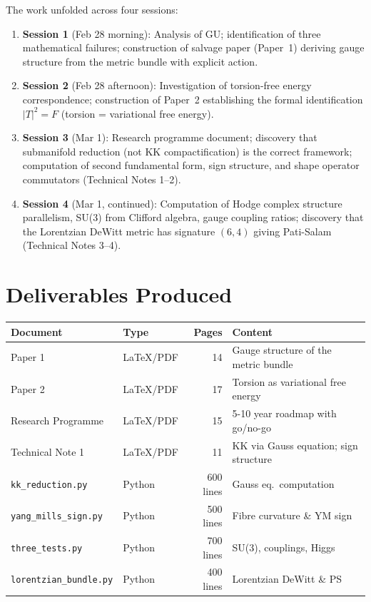 \documentclass[12pt,a4paper]{article}
\begin{document}
The work unfolded across four sessions:
\begin{enumerate}
\item \textbf{Session 1} (Feb 28 morning): Analysis of GU; identification of three mathematical failures; construction of salvage paper (Paper~1) deriving gauge structure from the metric bundle with explicit action.
\item \textbf{Session 2} (Feb 28 afternoon): Investigation of torsion-free energy correspondence; construction of Paper~2 establishing the formal identification $|T|^2 = F$ (torsion = variational free energy).
\item \textbf{Session 3} (Mar 1): Research programme document; discovery that submanifold reduction (not KK compactification) is the correct framework; computation of second fundamental form, sign structure, and shape operator commutators (Technical Notes 1--2).
\item \textbf{Session 4} (Mar 1, continued): Computation of Hodge complex structure parallelism, SU(3) from Clifford algebra, gauge coupling ratios; discovery that the Lorentzian DeWitt metric has signature $(6,4)$ giving Pati-Salam (Technical Notes 3--4).
\end{enumerate}

\section{Deliverables Produced}

\begin{center}
\begin{tabular}{llrl}
\toprule
\textbf{Document} & \textbf{Type} & \textbf{Pages} & \textbf{Content} \\
\midrule
Paper 1 & LaTeX/PDF & 14 & Gauge structure of the metric bundle \\
Paper 2 & LaTeX/PDF & 17 & Torsion as variational free energy \\
Research Programme & LaTeX/PDF & 15 & 5-10 year roadmap with go/no-go \\
Technical Note 1 & LaTeX/PDF & 11 & KK via Gauss equation; sign structure \\
\texttt{kk\_reduction.py} & Python & 600 lines & Gauss eq.\ computation \\
\texttt{yang\_mills\_sign.py} & Python & 500 lines & Fibre curvature \& YM sign \\
\texttt{three\_tests.py} & Python & 700 lines & SU(3), couplings, Higgs \\
\texttt{lorentzian\_bundle.py} & Python & 400 lines & Lorentzian DeWitt \& PS \\
\bottomrule
\end{tabular}
\end{center}
\end{document}
